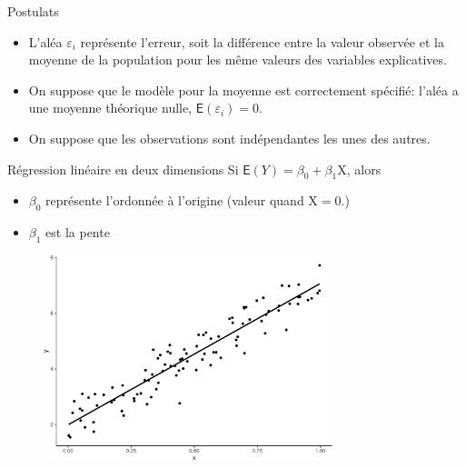 \documentclass[
  ignorenonframetext,
]{beamer}
\providecommand{\tightlist}{%
  \setlength{\itemsep}{0pt}\setlength{\parskip}{0pt}}\usepackage{longtable,booktabs,array}
\begin{document}
\begin{frame}{Postulats}
\protect\hypertarget{postulats}{}
\begin{itemize}
\tightlist
\item
  L'aléa \(\varepsilon_i\) représente l'erreur, soit la différence entre
  la valeur observée et la moyenne de la population pour les même
  valeurs des variables explicatives.
\item
  On suppose que le modèle pour la moyenne est correctement spécifié:
  l'aléa a une moyenne théorique nulle, \(\mathsf{E}(\varepsilon_i)=0\).
\item
  On suppose que les observations sont indépendantes les unes des
  autres.
\end{itemize}
\end{frame}

\begin{frame}{Régression linéaire en deux dimensions}
\protect\hypertarget{ruxe9gression-linuxe9aire-en-deux-dimensions}{}
Si \(\mathsf{E}(Y)=\beta_0 + \beta_1 \mathrm{X}\), alors

\begin{itemize}
\tightlist
\item
  \(\beta_0\) représente l'ordonnée à l'origine (valeur quand
  \(\mathrm{X}=0\).)
\item
  \(\beta_1\) est la pente
\end{itemize}

\begin{figure}

{\centering \includegraphics[width=0.75\textwidth,height=\textheight]{MATH60602-diapos4_files/figure-beamer/unnamed-chunk-1-1.pdf}

}

\end{figure}
\end{frame}
\end{document}
